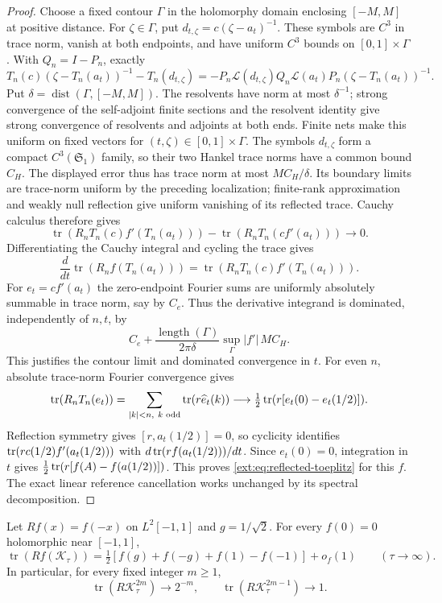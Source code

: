 \begin{proof}
Choose a fixed contour $\Gamma$ in the holomorphy domain enclosing
$[-M,M]$ at positive distance.  For $\zeta\in\Gamma$, put
$d_{t,\zeta}=c(\zeta-a_t)^{-1}$.  These symbols are $C^3$ in
trace norm, vanish at both endpoints, and have uniform $C^3$ bounds
on $[0,1]\times\Gamma$.  With $Q_n=I-P_n$, exactly
\[
 T_n(c)(\zeta-T_n(a_t))^{-1}-T_n(d_{t,\zeta})
 =-P_n\mathcal L(d_{t,\zeta})Q_n\mathcal L(a_t)P_n
           (\zeta-T_n(a_t))^{-1}.
\]
Put $\delta=\operatorname{dist}(\Gamma,[-M,M])$.
The resolvents have norm at most $\delta^{-1}$; strong convergence
of the self-adjoint finite sections and the resolvent identity give
strong convergence of resolvents and adjoints at both ends. Finite
nets make this uniform on fixed vectors for $(t,\zeta)\in[0,1]\times\Gamma$.
The symbols $d_{t,\zeta}$ form a compact $C^3(\mathfrak S_1)$ family,
so their two Hankel trace norms have a common bound $C_H$.
The displayed error thus has trace norm at most $MC_H/\delta$.
Its boundary limits are trace-norm uniform by the preceding localization;
finite-rank approximation and weakly null reflection give uniform
vanishing of its reflected trace. Cauchy calculus therefore gives
\[
 \operatorname{tr}(R_nT_n(c)f'(T_n(a_t)))
 -\operatorname{tr}(R_nT_n(cf'(a_t)))\longrightarrow0.
\]
Differentiating the Cauchy integral and cycling the trace gives
\[
 \frac d{dt}\operatorname{tr}(R_nf(T_n(a_t)))
 =\operatorname{tr}(R_nT_n(c)f'(T_n(a_t))).
\]
For $e_t=cf'(a_t)$ the zero-endpoint Fourier sums are uniformly
absolutely summable in trace norm, say by $C_e$. Thus the derivative
integrand is dominated, independently of $n,t$, by
\[
 C_e+\frac{\operatorname{length}(\Gamma)}{2\pi\delta}
                    \sup_\Gamma|f'|\,MC_H.
\]
This justifies the contour limit and dominated convergence in $t$.
For even $n$, absolute trace-norm Fourier convergence gives
\[
 \operatorname{tr}(R_nT_n(e_t))=\sum_{|k|<n,\ k\text{ odd}}\operatorname{tr}(r\widehat e_t(k))
 \longrightarrow\tfrac12\operatorname{tr}(r[e_t(0)-e_t(1/2)]).
\]
Reflection symmetry gives $[r,a_t(1/2)]=0$, so cyclicity identifies
$\operatorname{tr}(rc(1/2)f'(a_t(1/2)))$ with $d\operatorname{tr}(rf(a_t(1/2)))/dt$.
Since $e_t(0)=0$, integration in $t$ gives
$\tfrac12\operatorname{tr}(r[f(A)-f(a(1/2))])$. This proves
\eqref{ext:eq:reflected-toeplitz} for this $f$.  The exact linear
reference cancellation works unchanged by its spectral decomposition.


\end{proof}

\begin{theorem}
\label{ext:thm:polynomial-parity}\label{ext:thm:holomorphic-parity}
Let $Rf(x)=f(-x)$ on $L^2[-1,1]$ and $g=1/\sqrt2$.
For every $f(0)=0$ holomorphic near $[-1,1]$,
\begin{equation}\label{ext:eq:polynomial-parity}
 \operatorname{tr}(Rf(\mathcal K_\tau))
 =\tfrac12[f(g)+f(-g)+f(1)-f(-1)]+o_f(1)
 \qquad(\tau\to\infty).
\end{equation}
In particular, for every fixed integer $m\ge1$,
\[
 \operatorname{tr}(R\mathcal K_\tau^{2m})\longrightarrow2^{-m},
 \qquad
 \operatorname{tr}(R\mathcal K_\tau^{2m-1})\longrightarrow1.
\]
\end{theorem}

